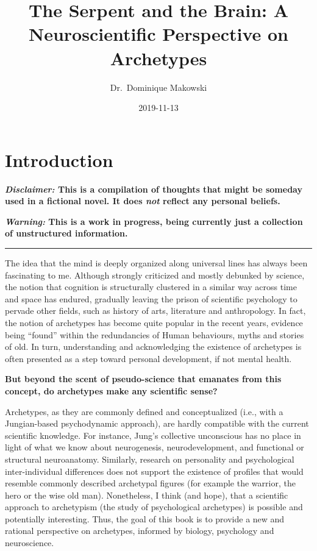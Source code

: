 \documentclass[]{book}
\title{The Serpent and the Brain: A Neuroscientific Perspective on Archetypes}
\author{Dr.~Dominique Makowski}
\date{2019-11-13}
\begin{document}
\maketitle

{
\setcounter{tocdepth}{1}
\tableofcontents
}
\hypertarget{introduction}{%
\chapter{Introduction}\label{introduction}}

\textbf{\emph{Disclaimer:} This is a compilation of thoughts that might be someday used in a fictional novel. It does \emph{not} reflect any personal beliefs.}

\textbf{\emph{Warning:} This is a work in progress, being currently just a collection of unstructured information.}

\begin{center}\rule{0.5\linewidth}{\linethickness}\end{center}

The idea that the mind is deeply organized along universal lines has always been fascinating to me. Although strongly criticized and mostly debunked by science, the notion that cognition is structurally clustered in a similar way across time and space has endured, gradually leaving the prison of scientific psychology to pervade other fields, such as history of arts, literature and anthropology. In fact, the notion of archetypes has become quite popular in the recent years, evidence being ``found'' within the redundancies of Human behaviours, myths and stories of old. In turn, understanding and acknowledging the existence of archetypes is often presented as a step toward personal development, if not mental health.

\textbf{But beyond the scent of pseudo-science that emanates from this concept, do archetypes make any scientific sense?}

Archetypes, as they are commonly defined and conceptualized (i.e., with a Jungian-based psychodynamic approach), are hardly compatible with the current scientific knowledge. For instance, Jung's collective unconscious has no place in light of what we know about neurogenesis, neurodevelopment, and functional or structural neuroanatomy. Similarly, research on personality and psychological inter-individual differences does not support the existence of profiles that would resemble commonly described archetypal figures (for example the warrior, the hero or the wise old man). Nonetheless, I think (and hope), that a scientific approach to archetypism (the study of psychological archetypes) is possible and potentially interesting. Thus, the goal of this book is to provide a new and rational perspective on archetypes, informed by biology, psychology and neuroscience.
\end{document}
